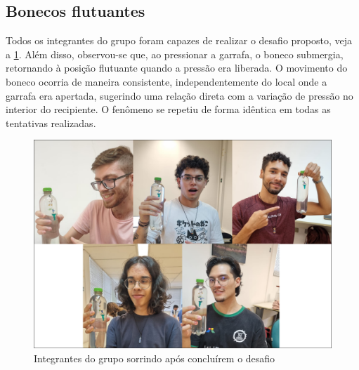 \subsection{Bonecos flutuantes}

Todos os integrantes do grupo foram capazes de realizar o desafio proposto, veja
a \cref{figdesafio}. Além disso, observou-se que, ao pressionar a garrafa, o
boneco submergia, retornando à posição flutuante quando a pressão era liberada.
O movimento do boneco ocorria de maneira consistente, independentemente do local
onde a garrafa era apertada, sugerindo uma relação direta com a variação de
pressão no interior do recipiente. O fenômeno se repetiu de forma idêntica em
todas as tentativas realizadas.

\begin{figure}[H]
    \centering
    \includegraphics[width=.5\linewidth]{fig/desafio.png}
    \caption{Integrantes do grupo sorrindo após concluírem o desafio}
    \label{figdesafio}
\end{figure}


